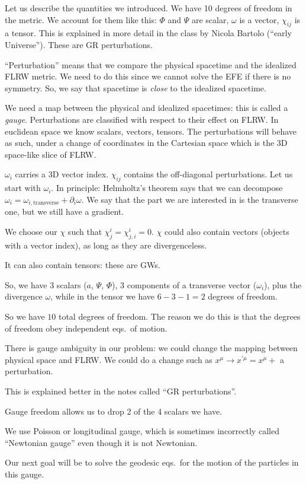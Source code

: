 \documentclass[main.tex]{subfiles}
\begin{document}
Let us describe the quantities we introduced.
We have 10 degrees of freedom in the metric.
We account for them like this: \(\Phi \) and \(\Psi \) are scalar, \(\omega \) is a vector, \(\chi_{ij}\) is a tensor. 
This is explained in more detail in the class by Nicola Bartolo (``early Universe''). These are GR perturbations. 

``Perturbation'' means that we compare the physical spacetime and the idealized FLRW metric. 
We need to do this since we cannot solve the EFE if there is no symmetry. 
So, we say that spacetime is \emph{close} to the idealized spacetime. 

We need a map between the physical and idealized spacetimes: this is called a \emph{gauge}. 
Perturbations are classified with respect to their effect on FLRW. 
In euclidean space we know scalars, vectors, tensors. 
The perturbations will behave as such, under a change of coordinates in the Cartesian space which is the 3D space-like slice of FLRW. 

\(\omega_{i}\) carries a 3D vector index. 
\(\chi_{ij}\) contains the off-diagonal perturbations. 
Let us start with  \(\omega_{i}\). In principle: Helmholtz's theorem says that we can decompose \(\omega_{i} = \omega_{i, \text{transverse}} + \partial_{i} \omega \).
We say that the part we are interested in is the transverse one, but we still have a gradient. 

We choose our \(\chi \) such that \(\chi^{i}_{j} = \chi^{i}_{j, i} =0\). 
\(\chi \) could also contain vectors (objects with a vector index), as long as they are divergenceless. 

It can also contain tensors: these are GWs. 

So, we have 3 scalars (\(a\), \(\Psi \), \(\Phi \)), 3 components of a transverse vector (\(\omega_{i}\)), plus the divergence \(\omega \), while in the tensor we have \(6 - 3- 1 = 2\) degrees of freedom. 

So we have \(10\) total degrees of freedom. 
The reason we do this is that the degrees of freedom obey independent eqs.\ of motion. 

There is gauge ambiguity in our problem: we could change the mapping between physical space and FLRW. 
We could do a change such as \(x^{\mu } \rightarrow x^{\prime \mu } = x^{\mu } + \) a perturbation. 

This is explained better in the notes called ``GR perturbations''. 

Gauge freedom allows us to drop 2 of the 4 scalars we have. 

We use Poisson or longitudinal gauge, which is sometimes incorrectly called ``Newtonian gauge'' even though it is not Newtonian. 

Our next goal will be to solve the geodesic eqs.\  for the motion of the particles in this gauge. 
\end{document}

